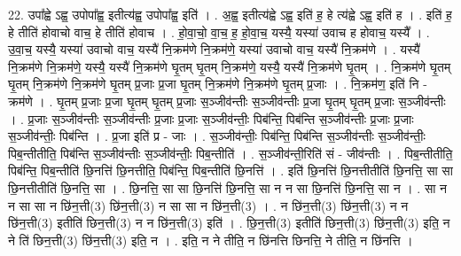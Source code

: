 \documentclass[17pt]{extarticle}
\begin{document}
22. उपा᳚ह्वे ऽह्व॒ उपोपा᳚ह्व॒ इतीत्य॑ह्व॒ उपोपा᳚ह्व॒ इति॑ । . अ॒ह्व॒ इतीत्य॑ह्वे ऽह्व॒ इति॑ ह॒ हे त्य॑ह्वे ऽह्व॒ इति॑ ह । . इति॑ ह॒ हे तीति॑ होवाचो वाच॒ हे तीति॑ होवाच । . हो॒वा॒चो॒ वा॒च॒ ह॒ हो॒वा॒च॒ यस्यै॒ यस्या॑ उवाच ह होवाच॒ यस्यै᳚ । . उ॒वा॒च॒ यस्यै॒ यस्या॑ उवाचो वाच॒ यस्यै॑ नि॒क्रम॑णे नि॒क्रम॑णे॒ यस्या॑ उवाचो वाच॒ यस्यै॑ नि॒क्रम॑णे । . यस्यै॑ नि॒क्रम॑णे नि॒क्रम॑णे॒ यस्यै॒ यस्यै॑ नि॒क्रम॑णे घृ॒तम् घृ॒तम् नि॒क्रम॑णे॒ यस्यै॒ यस्यै॑ नि॒क्रम॑णे घृ॒तम् । . नि॒क्रम॑णे घृ॒तम् घृ॒तम् नि॒क्रम॑णे नि॒क्रम॑णे घृ॒तम् प्र॒जाः प्र॒जा घृ॒तम् नि॒क्रम॑णे नि॒क्रम॑णे घृ॒तम् प्र॒जाः । . नि॒क्रम॑ण॒ इति॑ नि - क्रम॑णे । . घृ॒तम् प्र॒जाः प्र॒जा घृ॒तम् घृ॒तम् प्र॒जाः स॒ञ्जीव॑न्तीः स॒ञ्जीव॑न्तीः प्र॒जा घृ॒तम् घृ॒तम् प्र॒जाः स॒ञ्जीव॑न्तीः । . प्र॒जाः स॒ञ्जीव॑न्तीः स॒ञ्जीव॑न्तीः प्र॒जाः प्र॒जाः स॒ञ्जीव॑न्तीः॒ पिब॑न्ति॒ पिब॑न्ति स॒ञ्जीव॑न्तीः प्र॒जाः प्र॒जाः स॒ञ्जीव॑न्तीः॒ पिब॑न्ति । . प्र॒जा इति॑ प्र - जाः । . स॒ञ्जीव॑न्तीः॒ पिब॑न्ति॒ पिब॑न्ति स॒ञ्जीव॑न्तीः स॒ञ्जीव॑न्तीः॒ पिब॒न्तीतीति॒ पिब॑न्ति स॒ञ्जीव॑न्तीः स॒ञ्जीव॑न्तीः॒ पिब॒न्तीति॑ । . स॒ञ्जीव॑न्ती॒रिति॑ सं - जीव॑न्तीः । . पिब॒न्तीतीति॒ पिब॑न्ति॒ पिब॒न्तीति॑ छि॒नत्ति॑ छि॒नत्तीति॒ पिब॑न्ति॒ पिब॒न्तीति॑ छि॒नत्ति॑ । . इति॑ छि॒नत्ति॑ छि॒नत्तीतीति॑ छि॒नत्ति॒ सा सा छि॒नत्तीतीति॑ छि॒नत्ति॒ सा । . छि॒नत्ति॒ सा सा छि॒नत्ति॑ छि॒नत्ति॒ सा न न सा छि॒नत्ति॑ छि॒नत्ति॒ सा न । . सा न न सा सा न छि॑न॒त्ती(3) छि॑न॒त्ती(3) न सा सा न छि॑न॒त्ती(3) । . न छि॑न॒त्ती(3) छि॑न॒त्ती(3) न न छि॑न॒त्ती(3) इतीति॑ छिन॒त्ती(3) न न छि॑न॒त्ती(3) इति॑ । . छि॒न॒त्ती(3) इतीति॑ छिन॒त्ती(3) छि॑न॒त्ती(3) इति॒ न ने ति॑ छिन॒त्ती(3) छि॑न॒त्ती(3) इति॒ न । . इति॒ न ने तीति॒ न छि॑नत्ति छिनत्ति॒ ने तीति॒ न छि॑नत्ति । \newline
\end{document}
